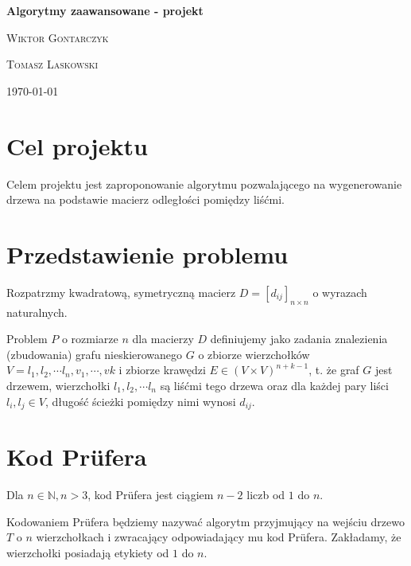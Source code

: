\documentclass[a4paper,12p]{article}
\begin{document}
\begin{titlepage}
	\begin{center}
	
	{\huge\bfseries Algorytmy zaawansowane - projekt\par}
	\vspace{1cm}
	{\Large\scshape Wiktor Gontarczyk\par}
	{\Large\scshape Tomasz Laskowski\par}
	\vspace{2cm}

	\today
	\vspace{1cm}	
	
	\end{center}
\end{titlepage}

\tableofcontents

\newpage

\section{Cel projektu}

Celem projektu jest zaproponowanie algorytmu pozwalającego na wygenerowanie drzewa na podstawie macierz odległości pomiędzy liśćmi.


\section{Przedstawienie problemu}

Rozpatrzmy kwadratową, symetryczną macierz $D=[d_{ij}]_{n \times n}$ o wyrazach naturalnych. 

Problem $P$ o rozmiarze $n$ dla macierzy $D$ definiujemy jako zadania znalezienia (zbudowania) grafu nieskierowanego $G$ o zbiorze wierzchołków $V = l_1, l_2, \cdots l_n, v_{1}, \cdots, v{k}$ i zbiorze krawędzi $E \in (V \times V)^{n+k-1}$, t. że graf $G$ jest drzewem, wierzchołki $l_1, l_2, \cdots l_n$ są liśćmi tego drzewa oraz dla każdej pary liści $l_i, l_j \in V$, długość ścieżki pomiędzy nimi wynosi $d_{ij}$.

\section{Kod Prüfera}

Dla $n \in \mathbb{N}, n > 3$, kod Prüfera jest ciągiem $n - 2$ liczb od $1$ do $n$.

Kodowaniem Prüfera będziemy nazywać algorytm przyjmujący na wejściu drzewo $T$ o $n$ wierzchołkach i zwracający odpowiadający mu kod Prüfera. Zakładamy, że wierzchołki posiadają etykiety od $1$ do $n$.
\end{document}
